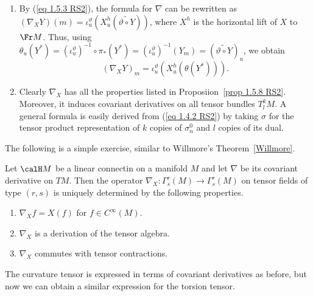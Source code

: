 \begin{rem}\label{rem 2.1.17 RS2}
    \begin{enumerate}
        \item By (\ref{eq 1.5.3 RS2}), the formula for $\nabla$ can be rewritten as $(\nabla_X Y)(m)=\iota_u^\vartheta(X_u^h(\widetilde{\vartheta\circ Y}))$, where $X^h$ is the horizontal lift of $X$ to $\Fr M$. Thus, using $\theta_u(Y^\ast)=(\iota_u^\vartheta)^{-1}\circ\pi_\ast(Y^\ast)=(\iota_u^\vartheta)^{-1}(Y_m)=(\widetilde{\vartheta\circ Y})_u$, we obtain 
        \[(\nabla_X Y)_m=\iota_u^\vartheta(X_u^h(\theta(Y^\ast))).\label{eq 2.1.31 RS2}\]
        \item Clearly $\nabla_X$ has all the properties listed in Proposiion~\ref{prop 1.5.8 RS2}. Moreover, it induces covariant derivatives on all tensor bundles $T^k_l M$. A general formula is easily derived from (\ref{eq 1.4.2 RS2}) by taking $\sigma$ for the tensor product representation of $k$ copies of $\sigma_n^0$ and $l$ copies of its dual.
    \end{enumerate}
\end{rem}

The following is a simple exercise, similar to Willmore's Theorem~\ref{Willmore}.
\begin{prop}[{{\cite[Prop.~2.1.18]{RS2}}}]\label{prop 2.1.18 RS2}
    Let $\calH M$ be a linear connectin on a manifold $M$ and let $\nabla$ be its covariant derivative on $TM$. Then the operator $\nabla_X:\Gamma^r_s(M)\to \Gamma^r_s(M)$ on tensor fields of type $(r,s)$ is uniquely determined by the following properties.
    \begin{enumerate}
        \item $\nabla_X f=X(f)$ for $f\in C^\infty(M)$.
        \item $\nabla_X$ is a derivation of the tensor algebra.
        \item $\nabla_X$ commutes with tensor contractions.
    \end{enumerate}
\end{prop}

The curvature tensor is expressed in terms of covariant derivatives as before, but now we can obtain a similar expression for the torsion tensor.

